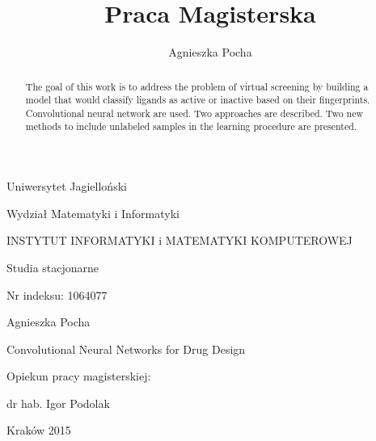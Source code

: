 \documentclass[a4paper,10pt]{report}
\title{Praca Magisterska}
\author{Agnieszka Pocha}
\newenvironment{bottompar}{\par\vspace*{\fill}}{\clearpage}
\begin{document}
  \begin{center}
    Uniwersytet Jagielloński
    
    Wydział Matematyki i Informatyki
    
    INSTYTUT INFORMATYKI i MATEMATYKI KOMPUTEROWEJ
    
    Studia stacjonarne 
  \end{center}
  Nr indeksu: 1064077  
  
  \begin{center}
   Agnieszka Pocha 
   
   \large Convolutional Neural Networks for Drug Design 
  \end{center}
  \begin{flushright}
    Opiekun pracy magisterskiej:
    
    dr hab. Igor Podolak 
  \end{flushright}

  \begin{bottompar}
  \begin{center}
   \large Kraków 2015
  \end{center}
  \end{bottompar}

  
  \begin{abstract}
    The goal of this work is to address the problem of virtual screening by building a model that would classify ligands as active or inactive based on their fingerprints. Convolutional neural network are used. Two approaches are described. Two new methods to include unlabeled samples in the learning procedure are presented.
  \end{abstract}
  
  \tableofcontents\vfill\eject
    
  
\end{document}
